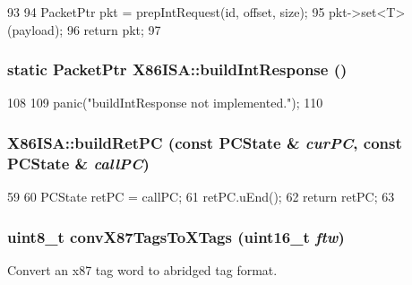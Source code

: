 \begin{DoxyCode}
93     {
94         PacketPtr pkt = prepIntRequest(id, offset, size);
95         pkt->set<T>(payload);
96         return pkt;
97     }
\end{DoxyCode}
\hypertarget{namespaceX86ISA_a70003879ed26e8f0387457d00d504b9c}{
\subsubsection[{buildIntResponse}]{\setlength{\rightskip}{0pt plus 5cm}static {\bf PacketPtr} X86ISA::buildIntResponse ()}}
\label{namespaceX86ISA_a70003879ed26e8f0387457d00d504b9c}



\begin{DoxyCode}
108     {
109         panic("buildIntResponse not implemented.\n");
110     }
\end{DoxyCode}
\hypertarget{namespaceX86ISA_a34db5b34654d49b312f2f744f3453346}{
\subsubsection[{buildRetPC}]{ X86ISA::buildRetPC (const PCState \& {\em curPC}, \/  const PCState \& {\em callPC})}}
\label{namespaceX86ISA_a34db5b34654d49b312f2f744f3453346}



\begin{DoxyCode}
59     {
60         PCState retPC = callPC;
61         retPC.uEnd();
62         return retPC;
63     }
\end{DoxyCode}
\hypertarget{namespaceX86ISA_add62d0d156403397cd87b43f80923727}{
\subsubsection[{convX87TagsToXTags}]{\setlength{\rightskip}{0pt plus 5cm}uint8\_\-t convX87TagsToXTags (uint16\_\-t {\em ftw})}}
\label{namespaceX86ISA_add62d0d156403397cd87b43f80923727}
Convert an x87 tag word to abridged tag format.

